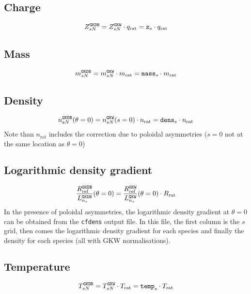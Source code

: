 \documentclass[a4paper]{report}
\begin{document}
\subsection{Charge}
\begin{equation}
Z_{sN}^{\texttt{GKDB}} = Z_{sN}^{\texttt{GKW}} \cdot q_\textrm{rat} = \texttt{z}_s \cdot q_\textrm{rat} 
\end{equation}

\subsection{Mass}
\begin{equation}
m_{sN}^{\texttt{GKDB}} = m_{sN}^{\texttt{GKW}} \cdot m_\textrm{rat} = \texttt{mass}_s \cdot m_\textrm{rat}
\end{equation}

\subsection{Density}
\begin{equation}
n_{sN}^{\texttt{GKDB}}(\theta=0) = n_{sN}^{\texttt{GKW}}(s=0) \cdot n_\textrm{rat} = \texttt{dens}_s \cdot n_\textrm{rat} 
\end{equation}
Note than $n_\textrm{rat}$ includes the correction due to poloidal asymmetries ($s=0$ not at the same location as $\theta=0$)

\subsection{Logarithmic density gradient}
\begin{equation}
\frac{R_{\textrm{ref}}^{\texttt{GKDB}}}{L_{n_s}^{\texttt{GKDB}}}(\theta=0) =  \frac{R_{\textrm{ref}}^{\texttt{GKW}}}{L_{n_s}^{\texttt{GKW}}}(\theta=0) \cdot R_\textrm{rat}
\end{equation}
In the presence of poloidal asymmetries, the logarithmic density gradient at $\theta=0$ can be obtained from the \texttt{cfdens} output file. In this file, the first column is the $s$ grid, then comes the logarithmic density gradient for each species and finally the density for each species (all with GKW normalisations). 

\subsection{Temperature}
\begin{equation}
T_{sN}^{\texttt{GKDB}} = T_{sN}^{\texttt{GKW}} \cdot T_\textrm{rat} = \texttt{temp}_s \cdot T_\textrm{rat}
\end{equation}
\end{document}
